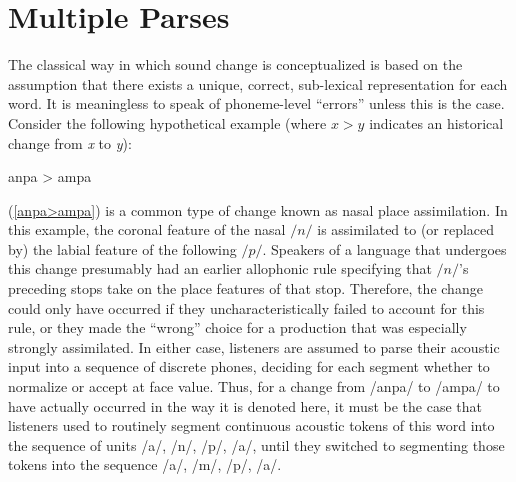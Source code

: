 \section{Multiple Parses}

The classical way in which sound change is conceptualized is based
on the assumption that there exists a unique, correct, sub-lexical
representation for each word. It is meaningless to speak of phoneme-level
“errors” unless this is the case. Consider the following hypothetical
example (where \emph{$x>y$} indicates an historical change from \emph{x}
to \emph{y}):
\begin{covexamples}
\item \label{anpa>ampa}{anpa \textgreater{} ampa}
\end{covexamples}
(\ref{anpa>ampa}) is a common type of change known as nasal place
assimilation. In this example, the coronal feature of the nasal $/n/$
is assimilated to (or replaced by) the labial feature of the following
$/p/$. Speakers of a language that undergoes this change presumably
had an earlier allophonic rule specifying that $/n/$'s preceding
stops take on the place features of that stop. Therefore, the change
could only have occurred if they uncharacteristically failed to account
for this rule, or they made the “wrong” choice for a production
that was especially strongly assimilated. In either case, listeners
are assumed to parse their acoustic input into a sequence of discrete
phones, deciding for each segment whether to normalize or accept at
face value. Thus, for a change from {/anpa/} to {/ampa/}
to have actually occurred in the way it is denoted here, it must be
the case that listeners used to routinely segment continuous acoustic
tokens of this word into the sequence of units {/a/}, {/n/},
{/p/}, {/a/}, until they switched to segmenting
those tokens into the sequence {/a/}, {/m/}, {/p/},
{/a/}. 

